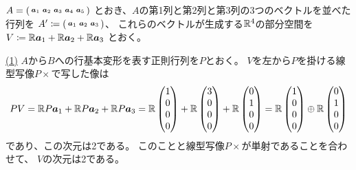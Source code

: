 \documentclass[report]{jlreq}
\begin{document}
\begin{answer}
    $A = \left({\begin{smallmatrix}
        \bm{a}_1 & \bm{a}_2 & \bm{a}_3 & \bm{a}_4 & \bm{a}_5
        \end{smallmatrix}}\right)$
    とおき、$A$の第1列と第2列と第3列の3つのベクトルを並べた行列を
    $A' \coloneqq \left({\begin{smallmatrix}
        \bm{a}_1 & \bm{a}_2 & \bm{a}_3
        \end{smallmatrix}}\right)$、
    これらのベクトルが生成する$\mathbb{R}^4$の部分空間を
    $V \coloneqq \mathbb{R} \bm{a}_1 + \mathbb{R} \bm{a}_2 + \mathbb{R} \bm{a}_3$
    とおく。

    \uline{(1)} \quad
    $A$から$B$への行基本変形を表す正則行列を$P$とおく。
    $V$を左から$P$を掛ける線型写像$P \times$で写した像は
    \begin{equation}
        PV
            = \mathbb{R} P \bm{a}_1 + \mathbb{R} P \bm{a}_2 + \mathbb{R} P \bm{a}_3
            = \mathbb{R} \begin{pmatrix}
                1 \\
                0 \\
                0 \\
                0 \\
            \end{pmatrix}
            + \mathbb{R} \begin{pmatrix}
                3 \\
                0 \\
                0 \\
                0 \\
            \end{pmatrix}
            + \mathbb{R} \begin{pmatrix}
                0 \\
                1 \\
                0 \\
                0 \\
            \end{pmatrix}
            = \mathbb{R} \begin{pmatrix}
                1 \\
                0 \\
                0 \\
                0 \\
            \end{pmatrix}
            \oplus \mathbb{R} \begin{pmatrix}
                0 \\
                1 \\
                0 \\
                0 \\
            \end{pmatrix}
    \end{equation}
    であり、この次元は2である。
    このことと線型写像$P \times$が単射であることを合わせて、
    $V$の次元は2である。


\end{answer}
\end{document}
